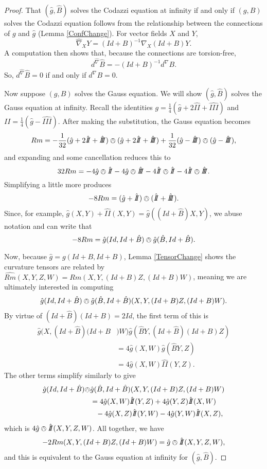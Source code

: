 \documentclass{amsart}
\newcommand{\two}{I\!\!I}
\newcommand{\three}{I\!\!I\!\!I}
\begin{document}
\begin{proof}
That $(\hat{g},\hat{B})$ solves the Codazzi equation at infinity if and only if $(g,B)$ solves the Codazzi equation follows from the relationship between the connections of $g$ and $\hat{g}$ (Lemma \ref{ConfChange}). 
For vector fields $X$ and $Y$,
\[
\widehat{\nabla}_XY = (Id+B)^{-1}\nabla_X(Id+B)Y.
\]
A computation then shows that, because the connections are torsion-free,
\[
d^{\widehat{\nabla}}\hat{B} = -(Id+B)^{-1}d^\nabla B.
\]
So, $d^{\widehat{\nabla}}\hat{B} = 0$ if and only if $d^\nabla B = 0$.

Now suppose $(g,B)$ solves the Gauss equation. 
We will show $(\hat{g},\hat{B})$ solves the Gauss equation at infinity. 
Recall the identities $g = \frac{1}{4}(\hat{g} + 2 \hat{\two} + \hat{\three})$ and $\two = \frac{1}{4}(\hat{g} - \hat{\three})$.
After making the substitution, the Gauss equation becomes 
\[
Rm = -\frac{1}{32}(\hat{g} + 2 \hat{\two} + \hat{\three})\owedge(\hat{g} + 2 \hat{\two} + \hat{\three}) + \frac{1}{32}(\hat{g} - \hat{\three})\owedge(\hat{g} - \hat{\three}),
\]
and expanding and some cancellation reduces this to
\[
32Rm = -4\hat{g}\owedge \hat{\two} -4 \hat{g} \owedge \hat{\three} - 4 \hat{\two}\owedge\hat{\two} - 4 \hat{\two}\owedge\hat{\three}.
\] 
Simplifying a little more produces
\[
-8Rm = (\hat{g} + \hat{\two})\owedge (\hat{\two} + \hat{\three}).
\]
Since, for example, $\hat{g}(X,Y) + \hat{\two}(X,Y) = \hat{g}((Id + \hat{B})X,Y)$, we abuse notation and can write that
\[
-8Rm = \hat{g}(Id, Id + \hat{B})\owedge \hat{g}(\hat{B}, Id + \hat{B}).
\]

Now, because $\hat{g} = g(Id + B, Id + B)$, Lemma \ref{TensorChange} shows the curvature tensors are related by $\widehat{Rm}(X,Y,Z,W) = Rm(X,Y,(Id+B)Z,(Id+B)W)$, meaning we are ultimately interested in computing
\[
\hat{g}(Id, Id + \hat{B})\owedge \hat{g}(\hat{B}, Id + \hat{B})(X,Y,(Id+B)Z,(Id+B)W).
\]
By virtue of $(Id + \hat{B})(Id+B) = 2 Id$, the first term of this is 
\begin{align*}
\hat{g}(X,(Id + \hat{B})(Id+B&)W)\hat{g}(\hat{B}Y,(Id + \hat{B})(Id+B)Z) \\
&= 4\hat{g}(X,W)\hat{g}(\hat{B}Y,Z) \\
&= 4 \hat{g}(X,W)\hat{\two}(Y,Z).
\end{align*}
The other terms simplify similarly to give
\begin{align*}
\hat{g}(Id, Id + \hat{B})\owedge &\hat{g}(\hat{B}, Id + \hat{B})(X,Y,(Id+B)Z,(Id+B)W) \\
&= 4 \hat{g}(X,W)\hat{\two}(Y,Z) + 4 \hat{g}(Y,Z)\hat{\two}(X,W) \\
&\phantom{=} -4 \hat{g}(X,Z)\hat{\two}(Y,W) - 4 \hat{g}(Y,W)\hat{\two}(X,Z),
\end{align*}
which is $4\hat{g}\owedge\hat{\two}(X,Y,Z,W)$.
All together, we have
\[
-2Rm(X,Y,(Id+B)Z,(Id+B)W) = \hat{g}\owedge\hat{\two}(X,Y,Z,W),
\]
and this is equivalent to the Gauss equation at infinity for $(\hat{g},\hat{B})$.


\end{proof}
\end{document}
